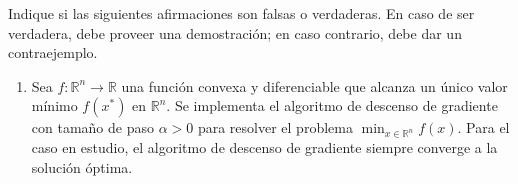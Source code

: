 Indique si las siguientes afirmaciones son falsas o verdaderas. En caso de ser verdadera, debe proveer una demostración; en caso contrario, debe dar un contraejemplo.  
\begin{enumerate}
\item Sea $f:\mathbb{R}^{n} \rightarrow \mathbb{R}$ una función convexa y diferenciable que alcanza un único valor mínimo $f(x^{*})$ en $\mathbb{R}^{n}$. Se implementa el algoritmo de descenso de gradiente con tamaño de paso $\alpha > 0$ para resolver el problema $\min_{x \in \mathbb{R}^{n}} f(x)$. Para el caso en estudio, el algoritmo de descenso de gradiente siempre converge a la solución óptima.
\end{enumerate}

